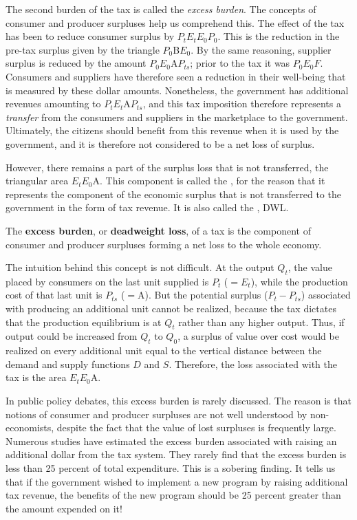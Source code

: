 The second burden of the tax is called the \textit{excess burden}. The
concepts of consumer and producer surpluses help us comprehend this. The
effect of the tax has been to reduce consumer surplus by $%
P_{t}E_{t}E_{0}P_{0}$. This is the reduction in the pre-tax surplus given by
the triangle $P_{0}$B$E_{0}$. By the same reasoning, supplier surplus is
reduced by the amount $P_{0}E_{0}$A$P_{ts}$; prior to the tax it was $%
P_{0}E_{0}F$. Consumers and suppliers have therefore seen a reduction in
their well-being that is measured by these dollar amounts. Nonetheless, the
government has additional revenues amounting to $P_{t}E_{t}$A$P_{ts}$, and
this tax imposition therefore represents a \textit{transfer} from the
consumers and suppliers in the marketplace to the government. Ultimately,
the citizens should benefit from this revenue when it is used by the
government, and it is therefore not considered to be a net loss of surplus.

\newhtmlpage

However, there remains a part of the surplus loss that is not transferred,
the triangular area $E_{t}E_{0}$A. This component is called the %
, for the reason that it represents the component
of the economic surplus that is not transferred to the government in the
form of tax revenue. It is also called the ,
DWL.

\begin{DefBox}
The \textbf{excess burden}, or \textbf{deadweight loss}, of a tax is the component of consumer and producer surpluses forming a net loss to the whole economy.
\end{DefBox}

The intuition behind this concept is not difficult. At the output $Q_{t}$,
the value placed by consumers on the last unit supplied is $P_{t}$ ($=E_{t}$),
while the production cost of that last unit is $P_{ts}$ ($=$A). But the
potential surplus ($P_{t}-P_{ts}$) associated with producing an additional
unit cannot be realized, because the tax dictates that the production
equilibrium is at $Q_{t}$ rather than any higher output. Thus, if output
could be increased from $Q_{t}$ to $Q_{0}$, a surplus of value over cost
would be realized on every additional unit equal to the vertical distance
between the demand and supply functions $D$ and $S$. Therefore, the loss
associated with the tax is the area $E_{t}E_{0}$A.

In public policy debates, this excess burden is rarely discussed. The reason
is that notions of consumer and producer surpluses are not well understood
by non-economists, despite the fact that the value of lost surpluses is
frequently large. Numerous studies have estimated the excess burden
associated with raising an additional dollar from the tax system. They
rarely find that the excess burden is less than 25 percent of total
expenditure. This is a sobering finding. It tells us that if the government
wished to implement a new program by raising additional tax revenue, the
benefits of the new program should be 25 percent greater than the amount
expended on it!

